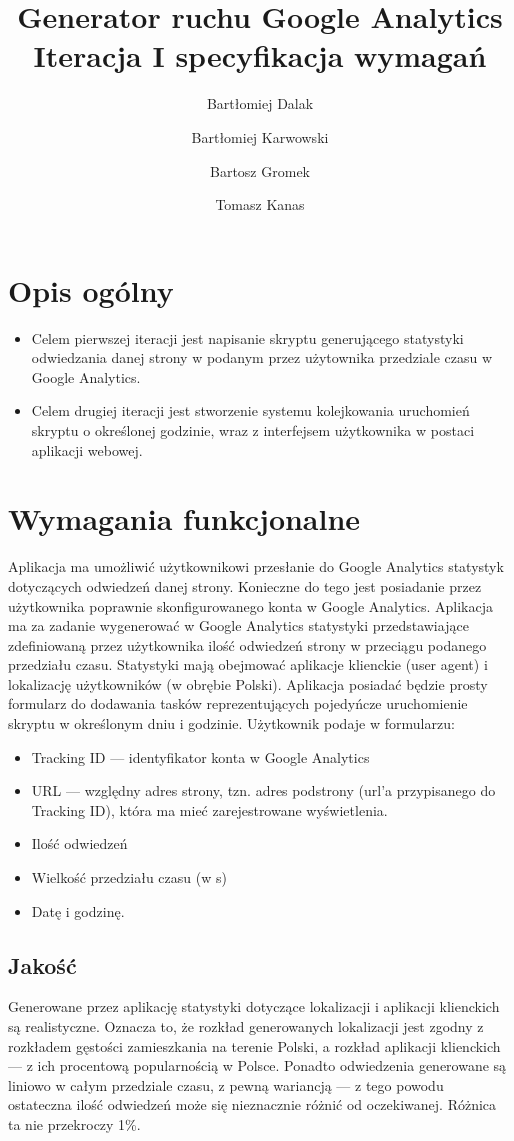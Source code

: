 \documentclass{article}
\title{Generator ruchu Google Analytics \\ Iteracja I specyfikacja wymagań}
\author{Bartłomiej Dalak \and Bartłomiej Karwowski \and Bartosz Gromek \and Tomasz Kanas}
\begin{document}
\maketitle

\section{Opis ogólny}
\begin{itemize}
\item Celem pierwszej iteracji jest napisanie skryptu generującego statystyki odwiedzania danej strony w podanym przez użytownika przedziale czasu w Google Analytics.
\item Celem drugiej iteracji jest stworzenie systemu kolejkowania uruchomień skryptu o określonej godzinie, wraz z interfejsem użytkownika w postaci aplikacji webowej.
\end{itemize}

\section{Wymagania funkcjonalne}

Aplikacja ma umożliwić użytkownikowi przesłanie do Google Analytics statystyk dotyczących odwiedzeń danej strony. Konieczne do tego jest posiadanie przez użytkownika poprawnie skonfigurowanego konta w Google Analytics. Aplikacja ma za zadanie wygenerować w Google Analytics statystyki przedstawiające zdefiniowaną przez użytkownika ilość odwiedzeń strony w przeciągu podanego przedziału czasu. Statystyki mają obejmować aplikacje klienckie (user agent) i lokalizację użytkowników (w obrębie Polski). Aplikacja posiadać będzie prosty formularz do dodawania tasków reprezentujących pojedyńcze uruchomienie skryptu w określonym dniu i godzinie. Użytkownik podaje w formularzu:
\begin{itemize}
\item Tracking ID --- identyfikator konta w Google Analytics
\item URL --- względny adres strony, tzn. adres podstrony (url'a przypisanego do Tracking ID), która ma mieć zarejestrowane wyświetlenia.
\item Ilość odwiedzeń
\item Wielkość przedziału czasu (w s)
\item Datę i godzinę.
\end{itemize}

\subsection{Jakość}
Generowane przez aplikację statystyki dotyczące lokalizacji i aplikacji klienckich są realistyczne. Oznacza to, że rozkład generowanych lokalizacji jest zgodny z rozkładem gęstości zamieszkania na terenie Polski, a rozkład aplikacji klienckich --- z ich procentową popularnością w Polsce. Ponadto odwiedzenia generowane są liniowo w całym przedziale czasu, z pewną wariancją --- z tego powodu ostateczna ilość odwiedzeń może się nieznacznie różnić od oczekiwanej. Różnica ta nie przekroczy 1\%.
\end{document}

